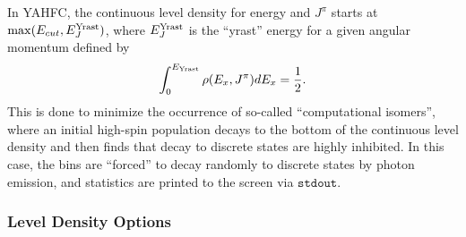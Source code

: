 \documentclass[
10pt,
showpacs,preprintnumbers,footinbib,
amsfonts,amsmath,amssymb,
aps,
prc,twocolumn,groupedaddress,superscriptaddress,
showkeys,
nofootinbib
]{revtex4-1}
\begin{document}
In YAHFC, the continuous level density for energy and $J^\pi$ starts at  $\max(E_{cut},E_J^{\rm Yrast})$, where $E_J^{\rm Yrast}$ is the ``yrast'' energy for a given angular momentum defined by
\begin{equation}
\int_0^{E_{\rm Yrast}} \rho(E_x,J^\pi) dE_x = \frac{1}{2}.
\end{equation}
This is done to minimize the occurrence of so-called ``computational isomers'', where an initial high-spin population decays to the bottom of the continuous level density and then finds that decay to discrete states are highly inhibited. In this case, the bins are ``forced'' to decay randomly to discrete states by photon emission, and statistics are printed to the screen via ${\texttt{stdout}}$.

\subsubsection{Level Density Options}
\end{document}
